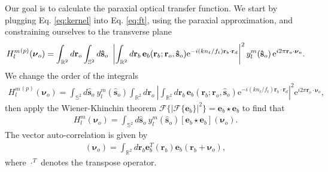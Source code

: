 \documentclass[11pt]{article}
\newcommand{\me}{\mathrm{e}}
\providecommand{\mb}[1]{\mathbf{#1}}
\providecommand{\ro}[1]{\mathbf{\mathbf{r}}_o}
\providecommand{\so}[1]{\mathbf{\hat{s}}_o}
\providecommand{\rb}[1]{\mathbf{r}_b}
\providecommand{\rd}[1]{\mathbf{r}_d}
\providecommand{\bs}[1]{\boldsymbol{#1}}
\begin{document}
Our goal is to calculate the paraxial optical transfer function. We start by
plugging Eq. \ref{eq:kernel} into Eq. \ref{eq:ft}, using the paraxial
approximation, and constraining ourselves to the transverse plane
\begin{align}
  {H_l^m}^{(p)}(\bs{\nu}_o) = \int_{\mathbb{R}^2}d\mb{r}_o{} \int_{\mathbb{S}^2}d\so{}\ \left|\int_{\mathbb{R}^2} d\rb{}\, \mb{e}_b(\rb{}; \ro{}, \so{})\me^{-i (kn_t/f_t) \rb{} \cdot \rd{}}\right|^2
 y_l^m(\so{})\thinspace\me^{i 2\pi \ro{}\cdot\bs{\nu}_o}\label{eq:ft2}.
\end{align}
We change the order of the integrals
\begin{align}
  {H_l^m}^{(p)}(\bs{\nu}_o) = \int_{\mathbb{S}^2}d\so{}\ y_l^m(\so{}) \int_{\mathbb{R}^2}d\mb{r}_o\ \left|\int_{\mathbb{R}^2} d\rb{}\, \mb{e}_b(\rb{}; \ro{}, \so{})\me^{-i (kn_t/f_t) \rb{} \cdot \rd{}}\right|^2 \me^{i 2\pi \ro{}\cdot\bs{\nu}_o}, 
\end{align}
then apply the Wiener-Khinchin theorem
$\mathcal{F}\{|\mathcal{F}\{\mb{e}_b\}|^2\} = \mb{e}_b \star \mb{e}_b$ to find
that
\begin{align}
  H_l^m(\bs{\nu}_o) = \int_{\mathbb{S}^2}d\so{}\ y_l^m(\so{}) \left[\mb{e}_b \star \mb{e}_b\right](\bs{\nu}_o). 
\end{align}
The vector auto-correlation is given by
\begin{align}
[\mb{e}_b \star \mb{e}_b](\bs{\nu}_o) = \int_{\mathbb{R}^2}d\bs{r}_b \mb{e}_b^{T}(\bs{r}_b)\mb{e}_b(\bs{r}_b + \bs{\nu}_o),
\end{align}
where $\cdot^T$ denotes the transpose operator. 
\end{document}
